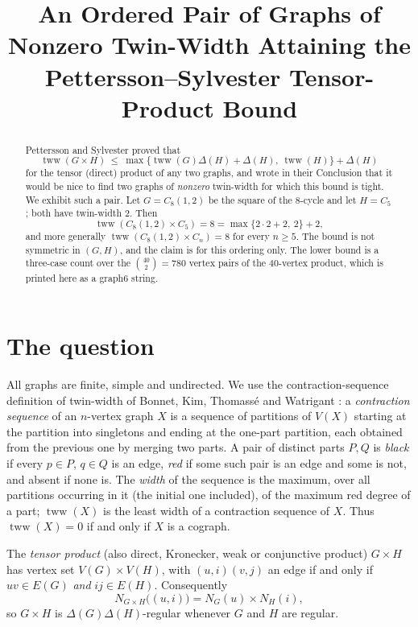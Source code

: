\documentclass[11pt]{amsart}
\title[An ordered pair attaining the tensor-product bound]
{An Ordered Pair of Graphs of Nonzero Twin-Width Attaining
 the Pettersson--Sylvester Tensor-Product Bound}
\date{}
\theoremstyle{remark}
\DeclareMathOperator{\tww}{tww}
\begin{document}
\begin{abstract}
Pettersson and Sylvester proved that
\[
 \tww(G\times H)\ \le\
 \max\bigl\{\tww(G)\Delta(H)+\Delta(H),\ \tww(H)\bigr\}+\Delta(H)
\]
for the tensor (direct) product of any two graphs, and wrote in their
Conclusion that it would be nice to find two graphs of \emph{nonzero}
twin-width for which this bound is tight. We exhibit such a pair. Let
$G=C_8(1,2)$ be the square of the $8$-cycle and let $H=C_5$; both have
twin-width $2$. Then
\[
 \tww(C_8(1,2)\times C_5)=8=\max\{2\cdot2+2,\ 2\}+2 ,
\]
and more generally $\tww(C_8(1,2)\times C_n)=8$ for every $n\ge5$. The bound is
not symmetric in $(G,H)$, and the claim is for this ordering only. The lower
bound is a three-case count over the $\binom{40}{2}=780$ vertex pairs of the
$40$-vertex product, which is printed here as a graph6 string.
\end{abstract}

\maketitle

\section{The question}

All graphs are finite, simple and undirected. We use the contraction-sequence
definition of twin-width of Bonnet, Kim, Thomass\'e and Watrigant
\cite{TwinwidthI}: a \emph{contraction sequence} of an $n$-vertex graph $X$ is
a sequence of partitions of $V(X)$ starting at the partition into singletons
and ending at the one-part partition, each obtained from the previous one by
merging two parts. A pair of distinct parts $P,Q$ is \emph{black} if every
$p\in P$, $q\in Q$ is an edge, \emph{red} if some such pair is an edge and some
is not, and absent if none is. The \emph{width} of the sequence is the maximum,
over all partitions occurring in it (the initial one included), of the maximum
red degree of a part; $\tww(X)$ is the least width of a contraction sequence of
$X$. Thus $\tww(X)=0$ if and only if $X$ is a cograph.

The \emph{tensor product} (also direct, Kronecker, weak or conjunctive product)
$G\times H$ has vertex set $V(G)\times V(H)$, with $(u,i)(v,j)$ an edge if and
only if $uv\in E(G)$ \emph{and} $ij\in E(H)$. Consequently
\begin{equation}\label{eq:nbhd}
 N_{G\times H}\bigl((u,i)\bigr)=N_G(u)\times N_H(i),
\end{equation}
so $G\times H$ is $\Delta(G)\Delta(H)$-regular whenever $G$ and $H$ are regular.
\end{document}
